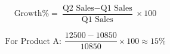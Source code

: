 \[
\text{Growth\%} = \frac{\text{Q2 Sales} - \text{Q1 Sales}}{\text{Q1 Sales}} \times 100
\]

\[
\text{For Product A: } 
\frac{12500 - 10850}{10850} \times 100 \approx 15\%
\]
